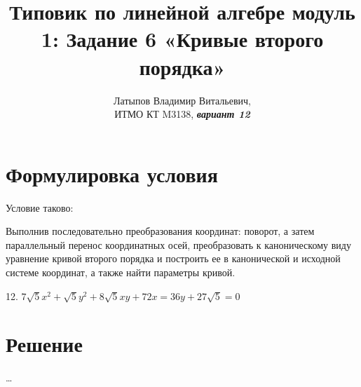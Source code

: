 \documentclass[12pt, a4paper]{article}
\author{Латыпов Владимир Витальевич, \\ ИТМО КТ M3138, \Huge{\textit{\textbf{вариант 12}}}}
\title{Типовик по линейной алгебре модуль 1: Задание 6 «Кривые второго порядка»}
\begin{document}
    \tittoc

    \section{Формулировка условия}

    \begin{statement}
        Условие таково: 
        
        Выполнив последовательно преобразования координат: поворот, а
        затем параллельный перенос координатных осей, преобразовать к
        каноническому виду уравнение кривой второго порядка и построить ее в
        канонической и исходной системе координат, а также найти параметры
        кривой.

        12. $7\sqrt{5} x^2 + \sqrt{5}y^2 + 8\sqrt{5}xy + 72x = 36y + 27\sqrt{5} = 0$
    \end{statement}

    \section{Решение}

    \dots
\end{document}
